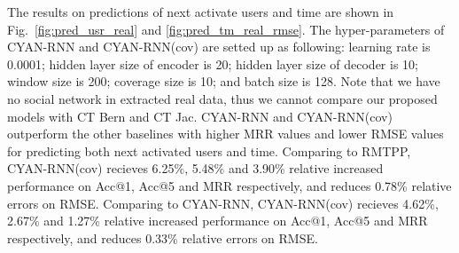 The results on predictions of next
activate users and time are shown in Fig.~\ref{fig:pred_usr_real} and
\ref{fig:pred_tm_real_rmse}. The hyper-parameters of CYAN-RNN and CYAN-RNN(cov)
are setted up as following: learning rate is 0.0001; hidden layer size of
encoder is 20; hidden layer size of decoder is 10; window size is 200; coverage
size is 10; and batch size is 128. Note that we have no social
network in extracted real data, thus we cannot compare our proposed models with
CT Bern and CT Jac. CYAN-RNN and CYAN-RNN(cov) outperform the other baselines
with higher MRR values and lower RMSE values for predicting both next activated
users and time. Comparing to RMTPP, CYAN-RNN(cov) recieves 6.25\%, 5.48\% and
3.90\% relative increased performance on Acc@1, Acc@5 and MRR respectively, and
reduces 0.78\% relative errors on RMSE. Comparing to CYAN-RNN, CYAN-RNN(cov)
recieves 4.62\%, 2.67\% and 1.27\% relative increased performance on Acc@1,
Acc@5 and MRR respectively, and reduces 0.33\% relative errors on RMSE.


